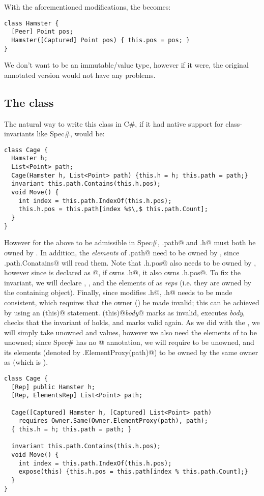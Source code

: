 With the aforementioned modifications, the \Q@Hamster@ becomes:
\begin{lstlisting}
class Hamster {
  [Peer] Point pos;
  Hamster([Captured] Point pos) { this.pos = pos; }
}
\end{lstlisting}

We don't want \Q@Point@ to be an immutable/value type, however if it were, the original annotated version would not have any problems.

\subsection{The \Q@Cage@ class} 
The natural way to write this class in C\#, if it had native support for class-invariants like Spec\#, would be:
\begin{lstlisting}
class Cage {
  Hamster h;
  List<Point> path;
  Cage(Hamster h, List<Point> path) {this.h = h; this.path = path;}
  invariant this.path.Contains(this.h.pos);
  void Move() { 
    int index = this.path.IndexOf(this.h.pos);
    this.h.pos = this.path[index %$\,$ this.path.Count];
  } 
}
\end{lstlisting}
However for the above \Q@invariant@ to be admissible in Spec\#, \Q@this.path@ and \Q@this.h@ must both be owned by \Q@this@. In addition, the \emph{elements} of \Q@this.path@ need to be owned by \Q@this@, since \Q@this.path.Conatains@ will read them. Note that \Q@this.h.pos@ also needs to be owned by \Q@this@, however since \Q@pos@ is declared as \Q@[Peer]@, if \Q@this@ owns \Q@this.h@, it also owns \Q@this.h.pos@. To fix the invariant, we will declare \Q@h@, \Q@path@, and the elements of \Q@path@ as \emph{reps} (i.e. they are owned by the containing object). Finally, since \Q@Move@ modifies \Q@this.h@, \Q@this.h@ needs to be made consistent, which requires that the owner (\Q@this@) be made invalid; this can be achieved by using an \Q@expose(this)@ statement. \Q@expose(this){@\emph{body}\Q@}@ marks \Q@this@ as invalid, executes \emph{body}, checks that the invariant of \Q@this@ holds, and marks \Q@this@ valid again.
As we did with the \Q@Hamster@, we will simply take unowned \Q@h@ and \Q@path@ values, however we also need the elements of \Q@path@ to be unowned; since Spec\# has no \Q@[ElementsCaptured]@ annotation, we will require \Q@path@ to be unowned, and its elements (denoted by \Q@Owner.ElementProxy(path)@) to be owned by the same owner as \Q@path@ (which is \Q@null@).
\begin{lstlisting}
class Cage {
  [Rep] public Hamster h;
  [Rep, ElementsRep] List<Point> path;
	
  Cage([Captured] Hamster h, [Captured] List<Point> path)
    requires Owner.Same(Owner.ElementProxy(path), path);
  { this.h = h; this.path = path; }
	
  invariant this.path.Contains(this.h.pos);
  void Move() { 
    int index = this.path.IndexOf(this.h.pos);
    expose(this) {this.h.pos = this.path[index % this.path.Count];}
  } 
}
\end{lstlisting}

